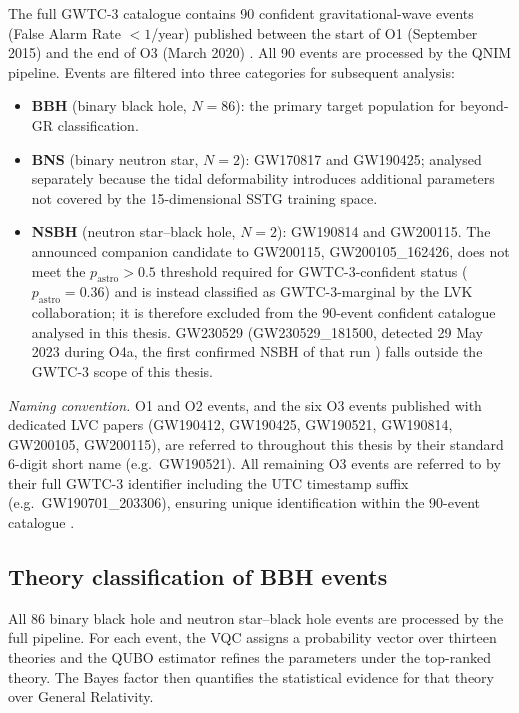 \documentclass[11pt,a4paper, english]{book}
\theoremstyle{plain}
\theoremstyle{definition}
\numberwithin{equation}{chapter}
\numberwithin{figure}{chapter}
\numberwithin{table}{chapter}
\begin{document}
The full GWTC-3 catalogue contains 90 confident gravitational-wave events
(False Alarm Rate $< 1$/year) published between the start of O1 (September
2015) and the end of O3 (March 2020) \cite{GWTC3_2023}.  All 90 events
are processed by the QNIM pipeline.  Events are filtered into three
categories for subsequent analysis:

\begin{itemize}
  \item \textbf{BBH} (binary black hole, $N = 86$): the primary target
        population for beyond-GR classification.
  \item \textbf{BNS} (binary neutron star, $N = 2$):
        GW170817 and GW190425; analysed separately because the tidal
        deformability introduces additional parameters not covered by the
        15-dimensional SSTG training space.
    \item \textbf{NSBH} (neutron star--black hole, $N = 2$):
      GW190814 and GW200115. The announced companion candidate to
      GW200115, GW200105\_162426, does not meet the $p_\mathrm{astro}>0.5$
      threshold required for GWTC-3-confident status
      ($p_\mathrm{astro}=0.36$) and is instead classified as
      GWTC-3-marginal by the LVK collaboration; it is therefore
      excluded from the 90-event confident catalogue analysed in this
      thesis. GW230529 (GW230529\_181500, detected 29 May 2023 during
      O4a, the first confirmed NSBH of that run
      \cite{Abac_2025_GWTC4}) falls outside the GWTC-3 scope of this
      thesis.
\end{itemize}

\noindent\textit{Naming convention.} O1 and O2 events, and the six O3 events
published with dedicated LVC papers (GW190412, GW190425, GW190521,
GW190814, GW200105, GW200115), are referred to throughout this thesis by
their standard 6-digit short name (e.g.\ GW190521).  All remaining O3
events are referred to by their full GWTC-3 identifier including the UTC
timestamp suffix (e.g.\ GW190701\_203306), ensuring unique identification
within the 90-event catalogue \cite{GWTC3_2023}.

\subsection{Theory classification of BBH events}
\label{subsec:bbh-classification}
All 86 binary black hole and neutron star–black hole events are processed by
the full pipeline. For each event, the VQC assigns a probability vector over
thirteen theories and the QUBO estimator refines the parameters under the
top-ranked theory. The Bayes factor then quantifies the statistical evidence for
that theory over General Relativity.
\end{document}
